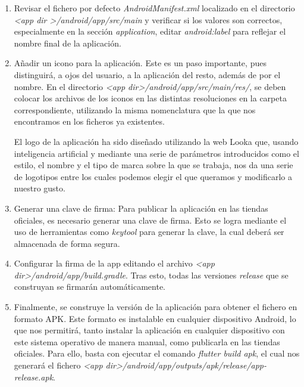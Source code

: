 \documentclass{article}
\begin{document}
\begin{enumerate}
    \item Revisar el fichero por defecto \textit{AndroidManifest.xml} localizado en el directorio \textit{\textless app dir \textgreater /android/app/src/main} y verificar si los valores son correctos, especialmente en la sección \textit{application}, editar \textit{android:label} para reflejar el nombre final de la aplicación.

    \newpage
    
    \item Añadir un icono para la aplicación. Este es un paso importante, pues distinguirá, a ojos del usuario, a la aplicación del resto, además de por el nombre. En el directorio \textit{\textless app dir\textgreater /android/app/src/main/res/}, se deben colocar los archivos de los iconos en las distintas resoluciones en la carpeta correspondiente, utilizando la misma nomenclatura que la que nos encontramos en los ficheros ya existentes.

    El logo de la aplicación ha sido diseñado utilizando la web Looka \cite{Lookah} que, usando inteligencia artificial y mediante una serie de parámetros introducidos como el estilo, el nombre y el tipo de marca sobre la que se trabaja, nos da una serie de logotipos entre los cuales podemos elegir el que queramos y modificarlo a nuestro gusto.

    \item Generar una clave de firma: Para publicar la aplicación en las tiendas oficiales, es necesario generar una clave de firma. Esto se logra mediante el uso de herramientas como \textit{keytool} para generar la clave, la cual deberá ser almacenada de forma segura.

    \item Configurar la firma de la app editando el archivo \textit{\textless app dir\textgreater /android/app/build.gradle}. Tras esto, todas las versiones \textit{release} que se construyan se firmarán automáticamente.

    \item Finalmente, se construye la versión de la aplicación para obtener el fichero en formato APK. Este formato es instalable en cualquier dispositivo Android, lo que nos permitirá, tanto instalar la aplicación en cualquier dispositivo con este sistema operativo de manera manual, como publicarla en las tiendas oficiales. Para ello, basta con ejecutar el comando \textit{flutter build apk}, el cual nos generará el fichero \textit{\textless app dir\textgreater /android/app/outputs/apk/release/app-release.apk}.
\end{enumerate}
\end{document}
